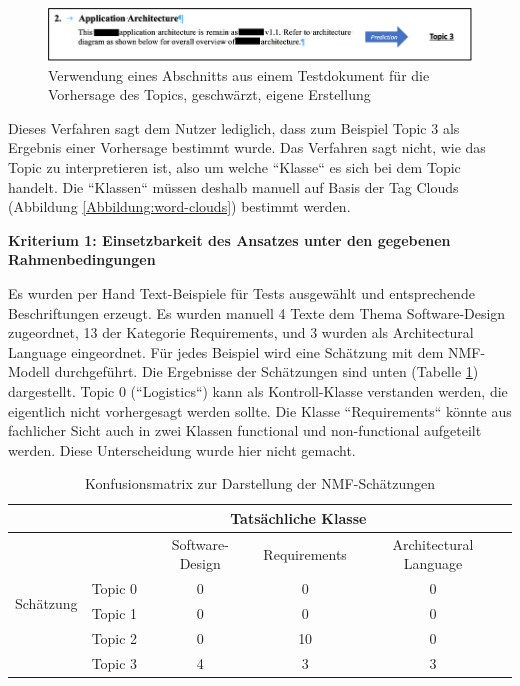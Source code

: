 \begin{figure}[h]
\centering
\includegraphics[scale=0.95]{content/pics/Picture_19.png}
\caption{Verwendung eines Abschnitts aus einem Testdokument für die Vorhersage des Topics, geschwärzt, eigene Erstellung}
\label{Abbildung:nmf-inf}
\end{figure}
 
Dieses Verfahren sagt dem Nutzer lediglich, dass zum Beispiel Topic 3 als Ergebnis einer Vorhersage bestimmt wurde. Das Verfahren sagt nicht, wie das Topic zu interpretieren ist, also um welche ``Klasse`` es sich bei dem Topic handelt. Die ``Klassen`` müssen deshalb manuell auf Basis der Tag Clouds (Abbildung \ref{Abbildung:word-clouds}) bestimmt werden.

{\bf Kriterium 1: Einsetzbarkeit des Ansatzes unter den gegebenen Rahmenbedingungen}

Es wurden per Hand Text-Beispiele für Tests ausgewählt und entsprechende Beschriftungen erzeugt. Es wurden manuell 4 Texte dem Thema Software-Design zugeordnet, 13 der Kategorie Requirements, und 3 wurden als Architectural Language eingeordnet. Für jedes Beispiel wird eine Schätzung mit dem NMF-Modell durchgeführt. Die Ergebnisse der Schätzungen sind unten (Tabelle \ref{tab:confusion-nmf}) dargestellt. Topic 0 (``Logistics``) kann als Kontroll-Klasse verstanden werden, die eigentlich nicht vorhergesagt werden sollte. Die Klasse ``Requirements`` könnte aus fachlicher Sicht auch in zwei Klassen functional und non-functional aufgeteilt werden. Diese Unterscheidung wurde hier nicht gemacht.

\begin{table}[h]
\centering
\begin{tabular}{|c|c|c|c|c|}
\hline
                           & \multicolumn{4}{c|}{Tatsächliche Klasse}                                  \\ \hline
\multirow{5}{*}{Schätzung} &         & Software-Design & Requirements & Architectural Language \\ \cline{2-5} 
                           & Topic 0 & 0               & 0            & 0                      \\ \cline{2-5} 
                           & Topic 1 & 0               & 0            & 0                      \\ \cline{2-5} 
                           & Topic 2 & 0               & 10           & 0                      \\ \cline{2-5} 
                           & Topic 3 & 4               & 3            & 3                      \\ \hline

\end{tabular}
\caption{Konfusionsmatrix zur Darstellung der NMF-Schätzungen}
\label{tab:confusion-nmf}
\end{table}

